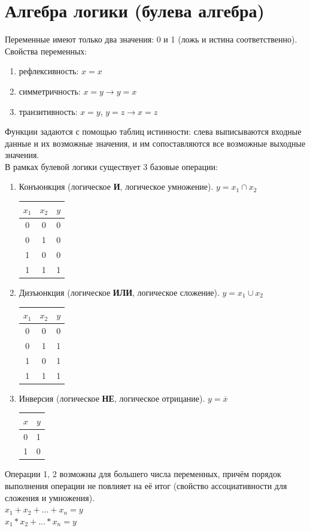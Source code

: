 \documentclass[a4paper,12pt]{report}
\begin{document}
\section{Алгебра логики (булева алгебра)}
Переменные имеют только два значения: 0 и 1 (ложь и истина соответственно).\\
Свойства переменных:
\begin{enumerate}
	\item рефлексивность: $x=x$
	\item симметричность: $x=y \to y=x$
	\item транзитивность: $x=y$, $y=z \to x=z$
\end{enumerate}
Функции задаются с помощью таблиц истинности: слева выписываются входные данные и их возможные значения, и им сопоставляются все возможные выходные значения.\\
В рамках булевой логики существует 3 базовые операции:
\begin{enumerate}
\item Конъюнкция (логическое \textbf{И}, логическое умножение). $y=x_1 \cap x_2$\\
\begin{tabular}{ c | c | c }
  $x_1$ & $x_2$ & $y$ \\ \hline
  0 & 0 & 0 \\
  0 & 1 & 0 \\
  1 & 0 & 0 \\
  1 & 1 & 1 \\
\end{tabular}
\item Дизъюнкция (логическое \textbf{ИЛИ}, логическое сложение). $y=x_1 \cup x_2$\\
\begin{tabular}{ c | c | c }
  $x_1$ & $x_2$ & $y$ \\ \hline
  0 & 0 & 0 \\
  0 & 1 & 1 \\
  1 & 0 & 1 \\
  1 & 1 & 1 \\
\end{tabular}
\item Инверсия (логическое \textbf{НЕ}, логическое отрицание). $y=\overline{x}$\\
\begin{tabular}{ c | c }
  $x$ & $y$ \\ \hline
  0 & 1 \\
  1 & 0 \\  
\end{tabular}
\end{enumerate}
Операции 1, 2 возможны для большего числа переменных, причём порядок выполнения операции не повлияет на её итог (свойство ассоциативности для сложения и умножения).\\
$x_1+x_2+...+x_n=y$\\
$x_1*x_2+...*x_n=y$\\
\end{document}
